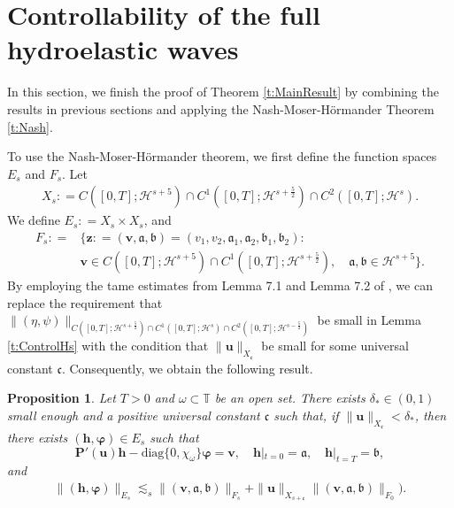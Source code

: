 \documentclass[12pt]{amsart}
\newtheorem{proposition}[theorem]{Proposition}
\theoremstyle{remark}
\theoremstyle{definition}
\numberwithin{equation}{section}
\renewcommand{\H}{{\mathcal H }}
\newcommand{\f}{\frac}
\newcommand{\T}{{\mathbb T}}
\begin{document}
\section{Controllability of the full hydroelastic waves} \label{s:Full}
In this section, we finish the proof of Theorem \ref{t:MainResult} by combining the results in previous sections and applying the Nash-Moser-H\"ormander Theorem \ref{t:Nash}.

To use the Nash-Moser-H\"ormander theorem, we first define the function spaces $E_s$ and $F_s$.
Let 
\begin{align*}
X_s : = C([0,T]; \H^{s+5})\cap C^1([0,T]; \H^{s+\frac{5}{2}})\cap C^2([0,T]; \H^{s}).
\end{align*}
We define $E_s : = X_s \times X_s$, and
\begin{align*}
F_s : = &\{\mathbf{z}: = (\mathbf{v}, \mathfrak{a}, \mathfrak{b}) = (v_1, v_2, \mathfrak{a}_1, \mathfrak{a}_2, \mathfrak{b}_1, \mathfrak{b}_2): \\
&\mathbf{v}\in C([0,T]; \H^{s+5})\cap C^1([0,T]; \H^{s+\frac{5}{2}}),\quad \mathfrak{a}, \mathfrak{b}\in \H^{s+5} \}.
\end{align*}
By employing the tame estimates from Lemma 7.1 and Lemma 7.2 of \cite{BHM}, we can replace the requirement that
$\| (\eta, \psi)\|_{C([0,T]; \H^{s+\f52})\cap C^1([0,T]; \H^{s})\cap C^2([0,T]; \H^{s-\f52})}$ be small in Lemma \ref{t:ControlHs} with the condition that $\|\mathbf{u}\|_{X_\mathfrak{c}}$ be small for some universal constant $\mathfrak{c}$. Consequently, we obtain the following result.
\begin{proposition}\label{t:Rightinv}
Let $T>0$ and $\omega \subset \T$ be an open set. 
There exists $\delta_*\in (0,1)$ small enough and a positive universal constant $\mathfrak{c}$ such that, if $\|\mathbf{u}\|_{X_\mathfrak{c}}< \delta_*$, then there exists $(\mathbf{h},\boldsymbol{\varphi})\in E_s$ such that
\begin{equation*}
\mathbf{P}'(\mathbf{u}) \mathbf{h} -\text{diag}\{0,\chi_\omega\}\boldsymbol{\varphi}= \mathbf{v}, \quad 
\mathbf{h}|_{t=0} =\mathfrak{a},\quad \mathbf{h}|_{t=T} =\mathfrak{b},
\end{equation*}
and
\begin{align*}
\|(\mathbf{h},\boldsymbol{\varphi})\|_{E_s} \lesssim_s \|(\mathbf{v},\mathfrak{a},\mathfrak{b})\|_{F_s}+\|\mathbf{u}\|_{X_{s+\mathfrak{c}}}\|(\mathbf{v},\mathfrak{a},\mathfrak{b})\|_{F_0}).
\end{align*}    
\end{proposition}
\end{document}
